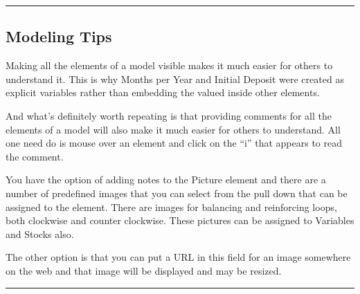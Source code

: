 \documentclass[]{memoir}
\begin{document}
\begin{center}\rule{3in}{0.4pt}\end{center}

\subsection{Modeling Tips}

Making all the elements of a model visible makes it much easier for
others to understand it. This is why Months per Year and Initial Deposit
were created as explicit variables rather than embedding the valued
inside other elements.

And what's definitely worth repeating is that providing comments for all
the elements of a model will also make it much easier for others to
understand. All one need do is mouse over an element and click on the
``i'' that appears to read the comment.

You have the option of adding notes to the Picture element and there are
a number of predefined images that you can select from the pull down
that can be assigned to the element. There are images for balancing and
reinforcing loops, both clockwise and counter clockwise. These pictures
can be assigned to Variables and Stocks also.

The other option is that you can put a URL in this field for an image
somewhere on the web and that image will be displayed and may be
resized.

\begin{center}\rule{3in}{0.4pt}\end{center}

\FloatBarrier 
\end{document}
